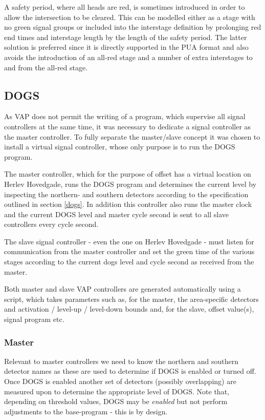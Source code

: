 A safety period, where all heads are red, is sometimes introduced in order to allow the intersection to be cleared. This can be modelled either as a stage with no green signal groups or included into the interstage definition by prolonging red end times and interstage length by the length of the safety period. The latter solution is preferred since it is directly supported in the PUA format and also avoids the introduction of an all-red stage and a number of extra interstages to and from the all-red stage.

\subsection{DOGS}
As VAP does not permit the writing of a program, which supervise all signal controllers at the same time, it was necessary to dedicate a signal controller as the master controller. To fully separate the master/slave concept it was chosen to install a virtual signal controller, whose only purpose is to run the DOGS program.

The master controller, which for the purpose of offset has a virtual location on Herlev Hovedgade, runs the DOGS program and determines the current level by inspecting the northern- and southern detectors according to the specification outlined in section \ref{dogs}. In addition this controller also runs the master clock and the current DOGS level and master cycle second is sent to all slave controllers every cycle second.

The slave signal controller - even the one on Herlev Hovedgade - must listen for communication from the master controller and set the green time of the various stages according to the current dogs level and cycle second as received from the master.

Both master and slave VAP controllers are generated automatically using a script, which takes parameters such as, for the master, the area-specific detectors and activation / level-up / level-down bounds and, for the slave, offset value(s), signal program etc.

\subsubsection{Master}
Relevant to master controllers we need to know the northern and southern detector names as these are used to determine if DOGS is enabled or turned off. Once DOGS is enabled another set of detectors (possibly overlapping) are measured upon to determine the appropriate level of DOGS. Note that, depending on threshold values, DOGS may be \textit{enabled} but not perform adjustments to the base-program - this is by design.

